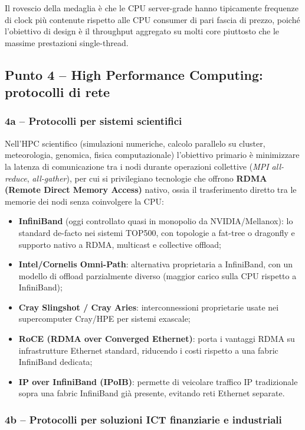 \documentclass[11pt,a4paper]{article}
\begin{document}
Il rovescio della medaglia è che le CPU server-grade hanno tipicamente frequenze di clock più contenute rispetto alle CPU consumer di pari fascia di prezzo, poiché l'obiettivo di design è il throughput aggregato su molti core piuttosto che le massime prestazioni single-thread.

\subsection{Punto 4 -- High Performance Computing: protocolli di rete}

\subsubsection{4a -- Protocolli per sistemi scientifici}

Nell'HPC scientifico (simulazioni numeriche, calcolo parallelo su cluster, meteorologia, genomica, fisica computazionale) l'obiettivo primario è minimizzare la latenza di comunicazione tra i nodi durante operazioni collettive (\emph{MPI all-reduce}, \emph{all-gather}), per cui si privilegiano tecnologie che offrono \textbf{RDMA (Remote Direct Memory Access)} nativo, ossia il trasferimento diretto tra le memorie dei nodi senza coinvolgere la CPU:

\begin{itemize}[nosep]
    \item \textbf{InfiniBand} (oggi controllato quasi in monopolio da NVIDIA/Mellanox): lo standard de-facto nei sistemi TOP500, con topologie a fat-tree o dragonfly e supporto nativo a RDMA, multicast e collective offload;
    \item \textbf{Intel/Cornelis Omni-Path}: alternativa proprietaria a InfiniBand, con un modello di offload parzialmente diverso (maggior carico sulla CPU rispetto a InfiniBand);
    \item \textbf{Cray Slingshot / Cray Aries}: interconnessioni proprietarie usate nei supercomputer Cray/HPE per sistemi exascale;
    \item \textbf{RoCE (RDMA over Converged Ethernet)}: porta i vantaggi RDMA su infrastrutture Ethernet standard, riducendo i costi rispetto a una fabric InfiniBand dedicata;
    \item \textbf{IP over InfiniBand (IPoIB)}: permette di veicolare traffico IP tradizionale sopra una fabric InfiniBand già presente, evitando reti Ethernet separate.
\end{itemize}

\subsubsection{4b -- Protocolli per soluzioni ICT finanziarie e industriali}
\end{document}
